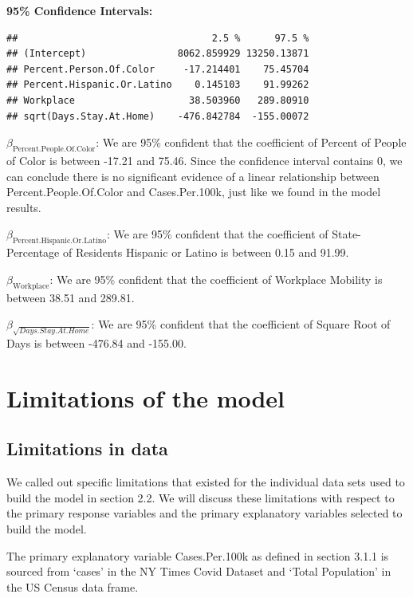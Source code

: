 \documentclass[
]{article}
\begin{document}
\textbf{95\% Confidence Intervals:}

\begin{verbatim}
##                                  2.5 %      97.5 %
## (Intercept)                8062.859929 13250.13871
## Percent.Person.Of.Color     -17.214401    75.45704
## Percent.Hispanic.Or.Latino    0.145103    91.99262
## Workplace                    38.503960   289.80910
## sqrt(Days.Stay.At.Home)    -476.842784  -155.00072
\end{verbatim}

\(\beta_{\text{Percent.People.Of.Color}}\): We are 95\% confident that
the coefficient of Percent of People of Color is between -17.21 and
75.46. Since the confidence interval contains 0, we can conclude there
is no significant evidence of a linear relationship between
Percent.People.Of.Color and Cases.Per.100k, just like we found in the
model results.

\(\beta_{\text{Percent.Hispanic.Or.Latino}}\): We are 95\% confident
that the coefficient of State-Percentage of Residents Hispanic or Latino
is between 0.15 and 91.99.

\(\beta_{\text{Workplace}}\): We are 95\% confident that the coefficient
of Workplace Mobility is between 38.51 and 289.81.

\(\beta_{\sqrt{Days.Stay.At.Home}}\): We are 95\% confident that the
coefficient of Square Root of Days is between -476.84 and -155.00.

\hypertarget{limitations-of-the-model}{%
\section{Limitations of the model}\label{limitations-of-the-model}}

\hypertarget{limitations-in-data}{%
\subsection{Limitations in data}\label{limitations-in-data}}

We called out specific limitations that existed for the individual data
sets used to build the model in section 2.2. We will discuss these
limitations with respect to the primary response variables and the
primary explanatory variables selected to build the model.

The primary explanatory variable Cases.Per.100k as defined in section
3.1.1 is sourced from `cases' in the NY Times Covid Dataset and `Total
Population' in the US Census data frame.
\end{document}
